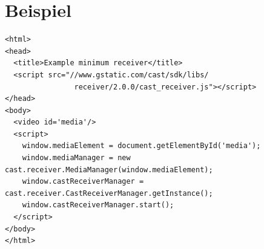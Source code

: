 \documentclass{beamer}
\begin{document}
\section{Beispiel}


\begin{lstlisting}[basicstyle=\tiny]
<html>
<head>
  <title>Example minimum receiver</title>
  <script src="//www.gstatic.com/cast/sdk/libs/
  				receiver/2.0.0/cast_receiver.js"></script>
</head>
<body>
  <video id='media'/>
  <script>
    window.mediaElement = document.getElementById('media');
    window.mediaManager = new cast.receiver.MediaManager(window.mediaElement);
    window.castReceiverManager = cast.receiver.CastReceiverManager.getInstance();
    window.castReceiverManager.start();
  </script>
</body>
</html>
\end{lstlisting}
\end{document}
